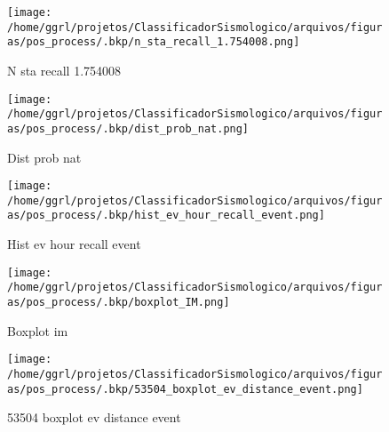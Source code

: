                     \begin{figure}[H]
                        \centering
                        \texttt{[image: /home/ggrl/projetos/ClassificadorSismologico/arquivos/figuras/pos\_process/.bkp/n\_sta\_recall\_1.754008.png]}
                        \caption{N sta recall 1.754008}
                        \label{fig:n_sta_recall_1.754008}
                    \end{figure}
                

                    \begin{figure}[H]
                        \centering
                        \texttt{[image: /home/ggrl/projetos/ClassificadorSismologico/arquivos/figuras/pos\_process/.bkp/dist\_prob\_nat.png]}
                        \caption{Dist prob nat}
                        \label{fig:dist_prob_nat}
                    \end{figure}
                

                    \begin{figure}[H]
                        \centering
                        \texttt{[image: /home/ggrl/projetos/ClassificadorSismologico/arquivos/figuras/pos\_process/.bkp/hist\_ev\_hour\_recall\_event.png]}
                        \caption{Hist ev hour recall event}
                        \label{fig:hist_ev_hour_recall_event}
                    \end{figure}
                

                    \begin{figure}[H]
                        \centering
                        \texttt{[image: /home/ggrl/projetos/ClassificadorSismologico/arquivos/figuras/pos\_process/.bkp/boxplot\_IM.png]}
                        \caption{Boxplot im}
                        \label{fig:boxplot_IM}
                    \end{figure}
                

                    \begin{figure}[H]
                        \centering
                        \texttt{[image: /home/ggrl/projetos/ClassificadorSismologico/arquivos/figuras/pos\_process/.bkp/53504\_boxplot\_ev\_distance\_event.png]}
                        \caption{53504 boxplot ev distance event}
                        \label{fig:53504_boxplot_ev_distance_event}
                    \end{figure}
                

